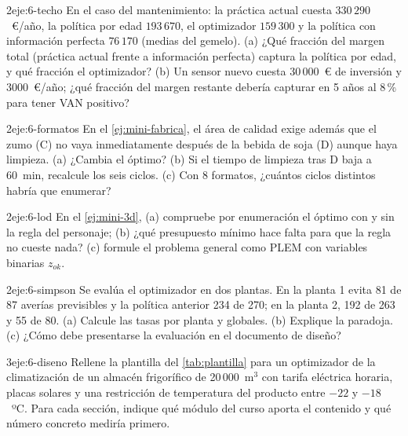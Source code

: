 \begin{ejercicio}{2}{eje:6-techo}
En el caso del mantenimiento: la práctica actual cuesta $330\,290$~€/año, la política por edad $193\,670$, el optimizador $159\,300$ y la política con información perfecta $76\,170$ (medias del gemelo). (a) ¿Qué fracción del margen total (práctica actual frente a información perfecta) captura la política por edad, y qué fracción el optimizador? (b) Un sensor nuevo cuesta 30\,000~€ de inversión y 3000~€/año; ¿qué fracción del margen restante debería capturar en 5 años al 8\,\% para tener VAN positivo?
\end{ejercicio}

\begin{ejercicio}{2}{eje:6-formatos}
En el \cref{ej:mini-fabrica}, el área de calidad exige además que el zumo (C) no vaya inmediatamente después de la bebida de soja (D) aunque haya limpieza. (a) ¿Cambia el óptimo? (b) Si el tiempo de limpieza tras D baja a 60~min, recalcule los seis ciclos. (c) Con 8 formatos, ¿cuántos ciclos distintos habría que enumerar?
\end{ejercicio}

\begin{ejercicio}{2}{eje:6-lod}
En el \cref{ej:mini-3d}, (a) compruebe por enumeración el óptimo con y sin la regla del personaje; (b) ¿qué presupuesto mínimo hace falta para que la regla no cueste nada? (c) formule el problema general como PLEM con variables binarias $z_{ok}$.
\end{ejercicio}

\begin{ejercicio}{2}{eje:6-simpson}
Se evalúa el optimizador en dos plantas. En la planta 1 evita 81 de 87 averías previsibles y la política anterior 234 de 270; en la planta 2, 192 de 263 y 55 de 80. (a) Calcule las tasas por planta y globales. (b) Explique la paradoja. (c) ¿Cómo debe presentarse la evaluación en el documento de diseño?
\end{ejercicio}

\begin{ejercicio}{3}{eje:6-diseno}
Rellene la plantilla del \cref{tab:plantilla} para un optimizador de la climatización de un almacén frigorífico de 20\,000~m$^{3}$ con tarifa eléctrica horaria, placas solares y una restricción de temperatura del producto entre $-22$ y $-18$~ºC. Para cada sección, indique qué módulo del curso aporta el contenido y qué número concreto mediría primero.
\end{ejercicio}
